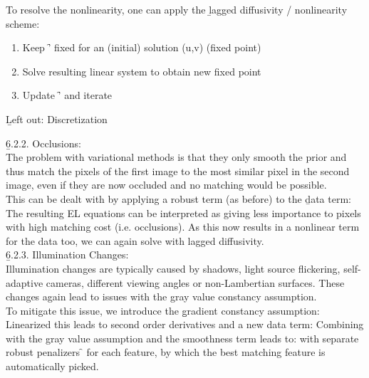 To resolve the nonlinearity, one can apply the \b{lagged diffusivity / nonlinearity} scheme:
\begin{enumerate}
    \item Keep \f{\Psi'} fixed for an (initial) solution (u,v) (fixed point)
    \item Solve resulting linear system to obtain new fixed point
    \item Update \f{\Psi'} and iterate
\end{enumerate}
\vspace{0.5em}
\b{Left out: Discretization}
\newpage

\b{6.2.2. Occlusions:\\[0.5em]}
The problem with variational methods is that they only smooth the prior and thus match the pixels of the first image to the most similar pixel in the second image, even if they are now occluded and no matching would be possible.\\
This can be dealt with by applying a robust term (as before) to the \b{data term}:
The resulting EL equations can be interpreted as giving less importance to pixels with high matching cost (i.e. occlusions). As this now results in a nonlinear term for the data too, we can again solve with lagged diffusivity.\\

\b{6.2.3. Illumination Changes:\\[0.5em]}
Illumination changes are typically caused by shadows, light source flickering, self-adaptive cameras, different viewing angles or non-Lambertian surfaces. These changes again lead to issues with the gray value constancy assumption.\\

To mitigate this issue, we introduce the \b{gradient} constancy assumption:
Linearized this leads to second order derivatives and a new data term:
Combining with the gray value assumption and the smoothness term leads to:
with separate robust penalizers \f{\Phi} for each feature, by which the best matching feature is automatically picked.\\

